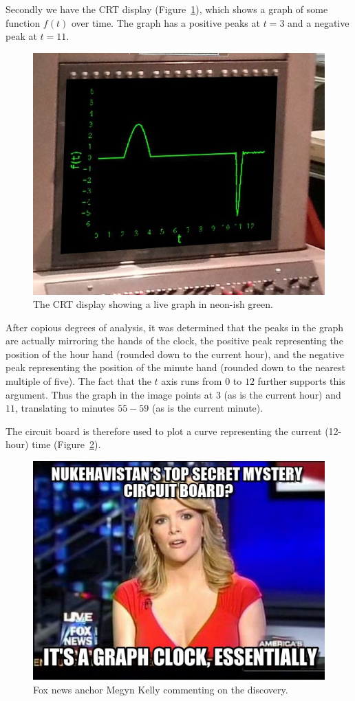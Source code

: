 Secondly we have the CRT display (Figure~\ref{fig:crt}), which shows a graph of some function $f(t)$ over time. The graph has a positive peaks at $t = 3$ and a negative peak at $t = 11$. 

\begin{figure}[h]
	\centering
	\includegraphics[width=0.8\columnwidth]{img/crt.jpg}
	\caption{The CRT display showing a live graph in neon-ish green.}
	\label{fig:crt}
\end{figure}

After copious degrees of analysis, it was determined that the peaks in the graph are actually mirroring the hands of the clock, the positive peak representing the position of the hour hand (rounded down to the current hour), and the negative peak representing the position of the minute hand (rounded down to the nearest multiple of five). The fact that the $t$ axis runs from $0$ to $12$ further supports this argument. Thus the graph in the image points at $3$ (as is the current hour) and $11$, translating to minutes $55-59$ (as is the current minute).

The circuit board is therefore used to plot a curve representing the current (12-hour) time (Figure~\ref{fig:essentially}).

\begin{figure}[h]
	\centering
	\includegraphics[width=0.8\columnwidth]{img/essentially.jpg}
	\caption{Fox news anchor Megyn Kelly commenting on the discovery.}
	\label{fig:essentially}
\end{figure}
